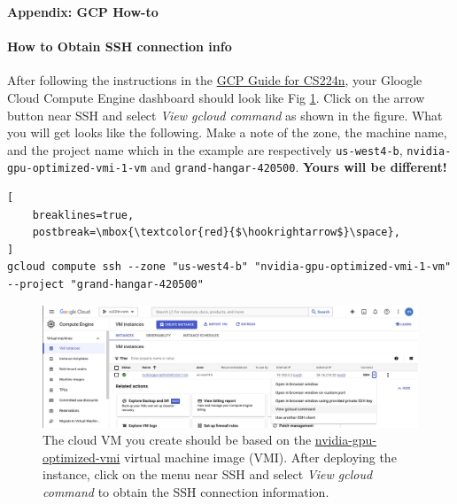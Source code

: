 \newpage
\clearpage

\Large{\textbf{Appendix: GCP How-to}}\\
\normalsize
\paragraph{How to Obtain SSH connection info}
After following the instructions in the \href{https://docs.google.com/document/d/1FLx0CXIn-SoExxKM1efC-E-6iBjUR4uEnpGnfemMMR0/edit?pli=1#heading=h.4tqnggp12z76}{GCP Guide for CS224n}, your Gloogle Cloud Compute Engine dashboard should look like Fig \ref{fig:gcloud-compute-dashboard}. Click on the arrow button near SSH and select \textit{View gcloud command} as shown in the figure. What you will get looks like the following. Make a note of the zone, the machine name, and the project name which in the example are respectively \texttt{us-west4-b}, \texttt{nvidia-gpu-optimized-vmi-1-vm} and \texttt{grand-hangar-420500}. \textbf{Yours will be different!}

\begin{lstlisting}[
    breaklines=true,
    postbreak=\mbox{\textcolor{red}{$\hookrightarrow$}\space},
]
gcloud compute ssh --zone "us-west4-b" "nvidia-gpu-optimized-vmi-1-vm"  --project "grand-hangar-420500"
\end{lstlisting}

\begin{figure}[h]
    \centering
    \includegraphics[width=\textwidth]{images/gcloud-dashboard.jpg}
    \caption{The cloud VM you create should be based on the \href{https://console.cloud.google.com/marketplace/product/nvidia-ngc-public/nvidia-gpu-optimized-vmi}{nvidia-gpu-optimized-vmi} virtual machine image (VMI). After deploying the instance, click on the menu near SSH and select \emph{View gcloud command} to obtain the SSH connection information.}
    \label{fig:gcloud-compute-dashboard}
\end{figure}




